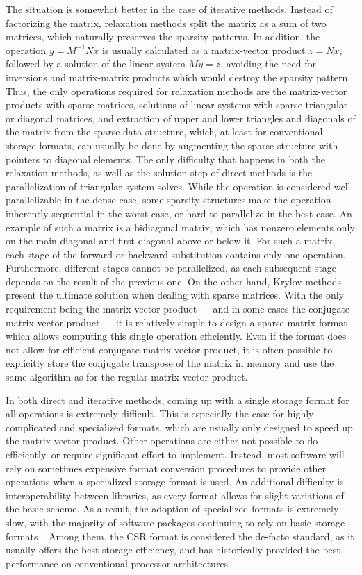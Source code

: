 The situation is somewhat better in the case of iterative methods. Instead of
factorizing the matrix, relaxation methods split the matrix as a sum of two
matrices, which naturally preserves the sparsity patterns. In addition, the
operation $y = M^{-1}Nx$ is usually calculated as a matrix-vector product $z =
Nx$, followed by a solution of the linear system $My = z$, avoiding the need for
inversions and matrix-matrix products which would destroy the sparsity pattern.
Thus, the only operations required for relaxation methods are the matrix-vector
products with sparse matrices, solutions of linear systems with sparse
triangular or diagonal matrices, and extraction of upper and lower triangles and
diagonals of the matrix from the sparse data structure, which, at least for
conventional storage formats, can usually be done by augmenting the sparse
structure with pointers to diagonal elements. The only difficulty that happens
in both the relaxation methods, as well as the solution step of direct methods
is the parallelization of triangular system solves. While the operation is
considered well-parallelizable in the dense case, some sparsity structures make
the operation inherently sequential in the worst case, or hard to parallelize in
the best case. An example of such a matrix is a bidiagonal matrix, which has
nonzero elements only on the main diagonal and first diagonal above or below it.
For such a matrix, each stage of the forward or backward substitution contains
only one operation. Furthermore, different stages cannot be parallelized, as each
subsequent stage depends on the result of the previous one.
On the other hand, Krylov methods present the ultimate solution when dealing
with sparse matrices.  With the only requirement being the matrix-vector product
--- and in some cases the conjugate matrix-vector product --- it is relatively
simple to design a sparse matrix format which allows computing this single
operation efficiently. Even if the format does not allow for efficient conjugate
matrix-vector product, it is often possible to explicitly store the conjugate
transpose of the matrix in memory and use the same algorithm as for the regular
matrix-vector product.

In both direct and iterative methods, coming up with a single storage format for
all operations is extremely difficult. This is especially the case for highly
complicated and specialized formats, which are usually only designed to speed up
the matrix-vector product. Other operations are either not possible to do
efficiently, or require significant effort to implement. Instead, most software
will rely on sometimes expensive format conversion procedures to provide other
operations when a specialized storage format is used. An additional
difficulty is interoperability between libraries, as every format allows for
slight variations of the basic scheme. As a result, the adoption
of specialized formats is extremely slow, with the majority of software packages
continuing to rely on basic storage
formats~\cite{ginkgo,paralution,vienna-cl,magma}. Among them, the CSR format is
considered the de-facto standard, as it usually offers the best storage
efficiency, and has historically provided the best performance on conventional
processor architectures.
